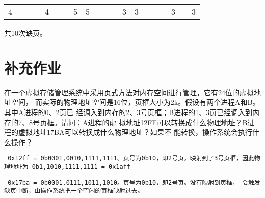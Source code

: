 \documentclass{ctexart}
\begin{document}
\begin{outline}[enumerate]
\begin{table}[H]
\begin{tabular}{c|c|c|c|c|l|c|c|c|c|c|c|c|c|c|c|c|c|c|c|}
    \cline{2-20}
    4                                       &                       &                       &                       & 4                     &                       &                       & 5                     & 5                     &                       &                       &                       & 3                     & 3                     &                       &                       &                       & 3                     &                       & 3                      \\
    \cline{2-20}
    \end{tabular}
    \end{table}
    共10次缺页。
\end{outline}
\section*{补充作业}
\begin{outline}[enumerate]
    \1 在一个虚拟存储管理系统中采用页式方法对内存空间进行管理，它有24位的虚拟地址空间，
    而实际的物理地址空间是16位，页框大小为2k。假设有两个进程A和B。其中A进程的0、2页已
    经调入到内存的2、3号页框；B进程的1、3页已经调入到内存的7、8号页框。请问：A进程的虚
    拟地址12FF可以转换成什么物理地址？B进程的虚拟地址17BA可以转换成什么物理地址？如果不
    能转换，操作系统会执行什么操作？

    \texttt{
        0x12ff = 0b0001,0010,1111,1111。页号为0b10，即2号页。映射到了3号页框，因此物理地址为
        0b1,1010,1111,1111 = 0x1aff
    }

    \texttt{
        0x17ba = 0b0001,0111,1011,1010。页号为0b10，即2号页。没有映射到页框，
        会触发缺页中断，由操作系统把一个空闲的页框映射过去。
    }

\end{outline}
\end{document}
